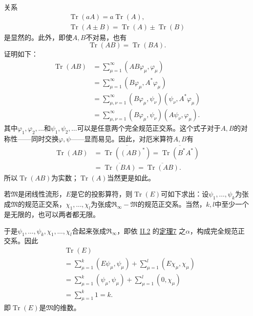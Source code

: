 \documentclass[fontsize=13pt,twoside,openany,headings=normal,parskip=false,bookmarkpackage=false,DIV=calc]{scrbook}
\begin{document}
关系
\begin{gather*}
\operatorname{Tr}(aA)=a\operatorname{Tr}(A),\\
\operatorname{Tr}(A\pm B)=\operatorname{Tr}(A)\pm\operatorname{Tr}(B)
\end{gather*}
是显然的。此外，即使$A,\allowbreak B$不对易，也有
\[
\operatorname{Tr}(AB)=\operatorname{Tr}(BA).
\]
证明如下：
\begin{align*}
\operatorname{Tr}(AB)
&=\sum_{\mu=1}^\infty(AB\varphi_\mu,\varphi_\mu)\\
&=\sum_{\mu=1}^\infty(B\varphi_\mu,A^*\varphi_\mu)\\
&=\sum_{\mu,\nu=1}^\infty(B\varphi_\mu,\psi_\nu)(\psi_\nu,A^*\varphi_\mu)\\
&=\sum_{\mu,\nu=1}^\infty(B\varphi_\mu,\psi_\nu)(A\psi_\nu,\varphi_\mu).
\end{align*}
其中$\varphi_1,\allowbreak \varphi_2,\allowbreak \ldots$和$\psi_1,\allowbreak \psi_2,\allowbreak \ldots$可以是任意两个完全规范正交系。这个式子对于$A,\allowbreak B$的对称性——同时交换$\varphi,\allowbreak \psi$——显而易见。因此，对厄米算符$A,\allowbreak B$有
\begin{align*}
\operatorname{Tr}(AB)
&=\overline{\operatorname{Tr}((AB)^*)}
=\overline{\operatorname{Tr}(B^*A^*)}\\
&=\overline{\operatorname{Tr}(BA)}
=\overline{\operatorname{Tr}(AB)}.
\end{align*}
所以$\operatorname{Tr}(AB)$为实数；$\operatorname{Tr}(A)$当然更是如此。

若$\mathfrak M$是闭线性流形，$E$是它的投影算符，则$\operatorname{Tr}(E)$可如下求出：设$\psi_1,\allowbreak \ldots,\allowbreak \psi_k$为张成$\mathfrak M$的规范正交系，$\chi_1,\allowbreak \ldots,\allowbreak \chi_l$为张成$\mathfrak R_\infty-\mathfrak M$的规范正交系。当然，$k,\allowbreak l$中至少一个是无限的，也可以两者都无限。

\hypertarget{origpage-95}{}\label{origpage-95}于是$\psi_1,\allowbreak \ldots,\allowbreak \psi_k,\allowbreak \chi_1,\allowbreak \ldots,\allowbreak \chi_l$合起来张成$\mathfrak R_\infty$，即依 \hyperref[sec:II.2]{II.2} 的\CJKglue \hyperref[thm:II.7]{定理7} 之$\alpha$，构成完全规范正交系。因此
\begin{align*}
&\operatorname{Tr}(E)\\
&=\sum_{\mu=1}^k(E\psi_\mu,\psi_\mu)+\sum_{\mu=1}^l(E\chi_\mu,\chi_\mu)\\
&=\sum_{\mu=1}^k(\psi_\mu,\psi_\mu)+\sum_{\mu=1}^l(0,\chi_\mu)\\
&=\sum_{\mu=1}^k1=k.
\end{align*}
即$\operatorname{Tr}(E)$是$\mathfrak M$的维数。
\end{document}
